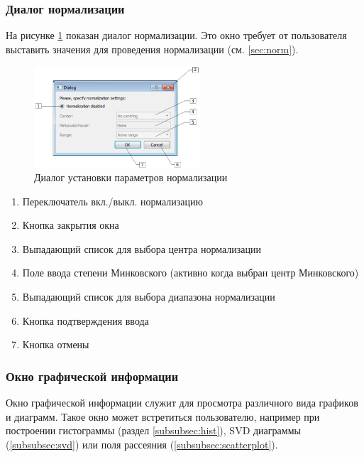 \documentclass[12pt]{instruction}
\begin{document}
\subsubsection{Диалог нормализации}

На рисунке \ref{fig:normdialog} показан диалог нормализации. Это окно требует от пользователя выставить значения для проведения нормализации (см. \ref{sec:norm}). 

\begin{figure}[h!]
	\centering
	\includegraphics[width=0.55\textwidth]{img/normdialog}
	\caption{Диалог установки параметров нормализации}
	\label{fig:normdialog}
\end{figure}

\begin{enumerate}
	\item Переключатель вкл./выкл. нормализацию
	\item Кнопка закрытия окна
	\item Выпадающий список для выбора центра нормализации
	\item Поле ввода степени Минковского (активно когда выбран центр Минковского)
	\item Выпадающий список для выбора диапазона нормализации
	\item Кнопка подтверждения ввода
	\item Кнопка отмены
\end{enumerate}

\subsubsection{Окно графической информации}

Окно графической информации служит для просмотра различного вида графиков и диаграмм. Такое окно может встретиться пользователю, например при построении гистограммы (раздел \ref{subsubsec:hist}), SVD диаграммы (\ref{subsubsec:svd}) или поля рассеяния (\ref{subsubsec:scatterplot}).
\end{document}

